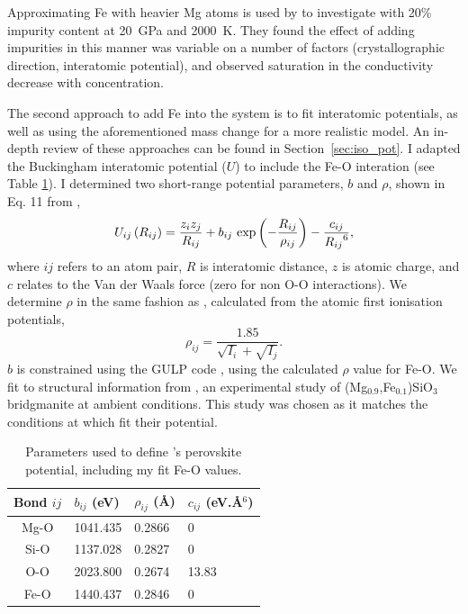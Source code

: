 Approximating Fe with heavier Mg atoms is used by \citet{Ammann2014} to investigate \mgfesios with 20\% impurity content at 20~GPa and 2000~K. They found the effect of adding impurities in this manner was variable on a number of factors (crystallographic direction, interatomic potential), and observed saturation in the conductivity decrease with concentration. 

The second approach to add Fe into the \mgsios system is to fit interatomic potentials, as well as using the aforementioned mass change for a more realistic model. An in-depth review of these approaches can be found in Section~\ref{sec:iso_pot}.  I adapted the \citet{Oganov2000} \mgsios Buckingham interatomic potential ($U$) to include the Fe-O interation (see Table \ref{tab:oganov_param_mod}). I determined two short-range potential parameters, $b$ and $\rho$, shown in Eq. 11 from \citet{Oganov2000},
%
\begin{equation}
U_{ij}\left ( R_{ij} \right ) = \frac{z_{i}z_{j}}{R_{ij}} + b_{ij}\ \textup{exp}\left ( - \frac{R_{ij}}{\rho_{ij}} \right ) - \frac{c_{ij}}{{R_{ij}}^{6}}, \label{og_buck}
\end{equation}
%
where $ij$ refers to an atom pair, $R$ is interatomic distance, $z$ is atomic charge, and $c$ relates to the Van der Waals force (zero for non O-O interactions). We determine $\rho$ in the same fashion as \citet{Oganov2000}, calculated from the atomic first ionisation potentials,
%
\begin{equation}
\rho_{ij} = \frac{1.85}{\sqrt{I_{i}}+\sqrt{I_{j}}}.  \label{urusov}
\end{equation}
%
$b$ is constrained using the GULP code \citep{Gale1997}, using the calculated $\rho$ value for Fe-O. We fit to structural information from \citet{Parise1990}, an experimental study of (Mg$_{0.9}$,Fe$_{0.1}$)SiO$_3$ bridgmanite at ambient conditions. This study was chosen as it matches the conditions at which \citet{Oganov2000} fit their potential. 

\begin{table}[h]
\centering
\caption[CONTENTS BIT]{\label{tab:oganov_param_mod}Parameters used to define \citet{Oganov2000}'s \mgsios perovskite potential, including my fit Fe-O values.}
\begin{tabular}{clll} 
Bond $ij$ & $b_{ij}$ (eV)  & $\rho_{ij}$ (\AA) & $c_{ij}$ (eV.\AA$^{6}$) \\ \hline
Mg-O        & 1041.435        & 0.2866                 & 0                \\
Si-O          & 1137.028        & 0.2827                 & 0                \\
O-O          & 2023.800        & 0.2674                  & 13.83 \\ 
Fe-O         & 1440.437        & 0.2846                  & 0 \\ \hline       
\end{tabular}
\end{table}

